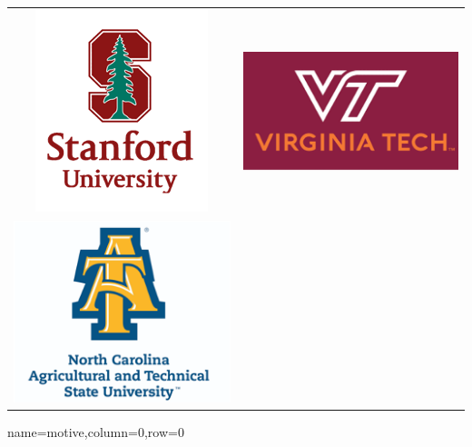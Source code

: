 \documentclass[landscape,paperwidth=70in,paperheight=46in,fontscale=0.225]{baposter} %
\begin{document}
\begin{poster}
{ 
\begin{tabular}{c c}
\includegraphics[scale=0.4]{logos/stanford.png} &
\includegraphics[scale=0.4]{logos/vt.png} \\
\includegraphics[scale=0.4]{logos/ncatnt.png} 
\end{tabular}
}

            

\vspace{-2.5in} %


          {name=motive,column=0,row=0}{
       
}
\end{poster}
\end{document}
